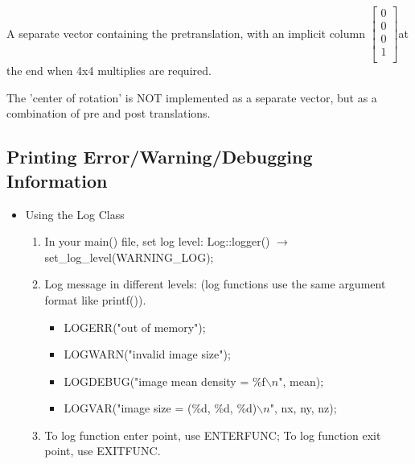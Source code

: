       A separate vector containing the pretranslation, with an implicit
      column   \( \left[ \begin{array}{c}
	  0\\0\\0\\1\\
	\end{array} \right] \)at the end when 4x4 multiplies are required.
      
      The 'center of rotation' is NOT implemented as a separate vector,
      but as a combination of pre and post translations.
      
      
      \subsection{Printing Error/Warning/Debugging Information} 
	   \begin{itemize}
	    \item
	      Using the Log Class
	     \begin{enumerate}
	       \item
		 In your main() file, set log level:  Log::logger()
		 \(\longrightarrow\)set\_log\_level(WARNING\_LOG); 
	       \item
		 Log message in different levels: (log functions use the same
		 argument format like printf()).
		 \begin{itemize}
		   \item[] LOGERR("out of memory");
		   \item[] LOGWARN("invalid image size");
		   \item[] LOGDEBUG("image mean density =
		   \%f\(\backslash n\)",
		   mean);
		   \item[] LOGVAR("image size = (\%d, \%d,
		   \%d)\(\backslash n\)", nx, ny, nz);
		 \end{itemize}
	       \item
		 To log function enter point, use ENTERFUNC; To log
		 function exit point, use EXITFUNC. 
	     \end{enumerate}
	   \end{itemize} 

